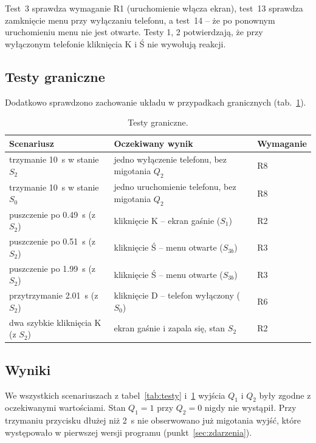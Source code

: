 Test~3 sprawdza wymaganie R1 (uruchomienie włącza ekran), test~13
sprawdza zamknięcie menu przy wyłączaniu telefonu, a test~14 -- że po
ponownym uruchomieniu menu nie jest otwarte. Testy 1, 2 potwierdzają,
że przy wyłączonym telefonie kliknięcia K i Ś nie wywołują reakcji.

\subsection{Testy graniczne}
Dodatkowo sprawdzono zachowanie układu w przypadkach granicznych
(tab.~\ref{tab:graniczne}).

\begin{table}[H]
\centering
\caption{Testy graniczne.}
\label{tab:graniczne}
\begin{tabular}{lll}
\toprule
Scenariusz & Oczekiwany wynik & Wymaganie \\
\midrule
trzymanie \SI{10}{\second} w stanie $S_2$ & jedno wyłączenie telefonu, bez migotania $Q_2$ & R8 \\
trzymanie \SI{10}{\second} w stanie $S_0$ & jedno uruchomienie telefonu, bez migotania $Q_2$ & R8 \\
puszczenie po \SI{0,49}{\second} (z $S_2$) & kliknięcie K -- ekran gaśnie ($S_1$) & R2 \\
puszczenie po \SI{0,51}{\second} (z $S_2$) & kliknięcie Ś -- menu otwarte ($S_{3b}$) & R3 \\
puszczenie po \SI{1,99}{\second} (z $S_2$) & kliknięcie Ś -- menu otwarte ($S_{3b}$) & R3 \\
przytrzymanie \SI{2,01}{\second} (z $S_2$) & kliknięcie D -- telefon wyłączony ($S_0$) & R6 \\
dwa szybkie kliknięcia K (z $S_2$) & ekran gaśnie i zapala się, stan $S_2$ & R2 \\
\bottomrule
\end{tabular}
\end{table}

\subsection{Wyniki}
We wszystkich scenariuszach z tabel~\ref{tab:testy}
i~\ref{tab:graniczne} wyjścia $Q_1$ i $Q_2$ były zgodne z oczekiwanymi
wartościami. Stan $Q_1=1$ przy $Q_2=0$ nigdy nie wystąpił. Przy
trzymaniu przycisku dłużej niż \SI{2}{\second} nie obserwowano już
migotania wyjść, które występowało w pierwszej wersji programu
(punkt~\ref{sec:zdarzenia}).
